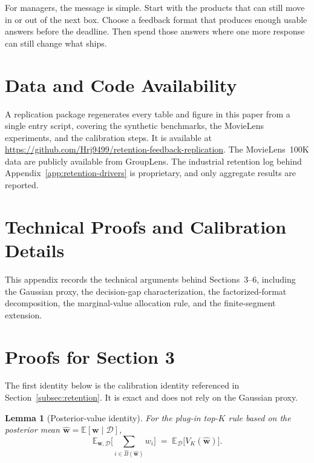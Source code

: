\documentclass[11pt]{article}
\newtheorem{lemma}[theorem]{Lemma}
\theoremstyle{definition}
\theoremstyle{remark}
\newcommand{\E}{\mathbb{E}}
\newcommand{\1}{\mathbf{1}}
\newcommand{\w}{\mathbf{w}}
\newcommand{\cD}{\mathcal{D}}
\begin{document}
For managers, the message is simple. Start with the products that can
still move in or out of the next box. Choose a feedback format that
produces enough usable answers before the deadline. Then spend those
answers where one more response can still change what ships.

\section*{Data and Code Availability}

A replication package regenerates every table and figure in this paper
from a single entry script, covering the synthetic benchmarks, the
MovieLens experiments, and the calibration steps. It is available at
\url{https://github.com/Hrj9499/retention-feedback-replication}. The
MovieLens~100K data are publicly available from GroupLens. The
industrial retention log behind
Appendix~\ref{app:retention-drivers} is proprietary, and only
aggregate results are reported.





\appendix
\section*{Technical Proofs and Calibration Details}

This appendix records the technical arguments behind Sections~3--6,
including the Gaussian proxy, the decision-gap characterization, the
factorized-format decomposition, the marginal-value allocation rule,
and the finite-segment extension.

\section{Proofs for Section 3}

The first identity below is the calibration identity referenced in
Section~\ref{subsec:retention}. It is exact and does not rely on the
Gaussian proxy.

\begin{lemma}[Posterior-value identity]\label{lem:posterior-value}
For the plug-in top-$K$ rule based on the posterior mean
\(\hat{\w}=\E[\w\mid\cD]\),
\[
\E_{\w,\cD}\!\Big[\sum_{i\in \hat B(\hat{\w})} w_i\Big]
\;=\;
\E_{\cD}\!\big[V_K(\hat{\w})\big].
\]
\end{lemma}
\end{document}
